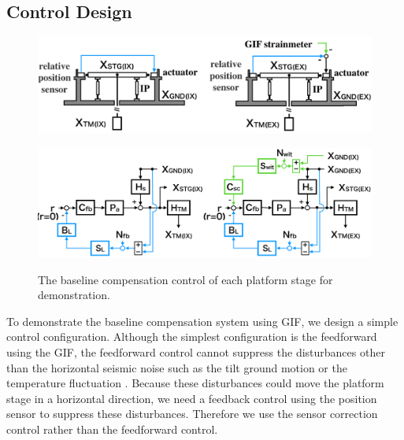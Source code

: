\subsection{Control Design}
\begin{figure}[h]
  \begin{minipage}{14cm}
    \begin{center}   
      \includegraphics[width=14cm]{./img_chap6/img630a.png}
      \label{img:img630a} \hfill\vspace{10pt}
    \end{center}
  \end{minipage}
  \begin{minipage}{14cm}
    \begin{center}   
      \includegraphics[width=14cm]{./img_chap6/img630b.png}
      \label{img:img630b}
    \end{center}
  \end{minipage}
  \caption{The baseline compensation control of each platform stage for demonstration.}
\end{figure}

To demonstrate the baseline compensation system using GIF, we design a simple control configuration. Although the simplest configuration is the feedforward using the GIF, the feedforward control cannot suppress the disturbances other than the horizontal seismic noise such as the tilt ground motion or the temperature fluctuation \cite{sekiguchi2016astudy}. Because these disturbances could move the platform stage in a horizontal direction, we need a feedback control using the position sensor to suppress these disturbances. Therefore we use the sensor correction control rather than the feedforward control. 

